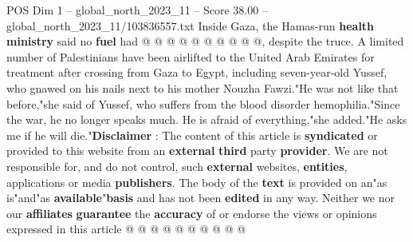 \begin{textsample}{POS Dim 1 – global\_north\_2023\_11 – Score 38.00 – global\_north\_2023\_11/103836557.txt}
Inside Gaza, the Hamas-run \textbf{health} \textbf{ministry} said no \textbf{fuel} had @ @ @ @ @ @ @ @ @ @, despite the truce.
A limited number of Palestinians have been airlifted to the United Arab Emirates for treatment after crossing from Gaza to Egypt, including seven-year-old Yussef, who gnawed on his nails next to his mother Nouzha Fawzi."He was not like that before,"she said of Yussef, who suffers from the blood disorder hemophilia."Since the war, he no longer speaks much.
He is afraid of everything,"she added."He asks me if he will die."\textbf{Disclaimer} : The content of this article is \textbf{syndicated} or provided to this website from an \textbf{external} \textbf{third} party \textbf{provider}.
We are not responsible for, and do not control, such \textbf{external} websites, \textbf{entities}, applications or media \textbf{publishers}.
The body of the \textbf{text} is provided on an"as is"and"as \textbf{available}"\textbf{basis} and has not been \textbf{edited} in any way.
Neither we nor our \textbf{affiliates} \textbf{guarantee} the \textbf{accuracy} of or endorse the views or opinions expressed in this article @ @ @ @ @ @ @ @ @ @

\end{textsample}
